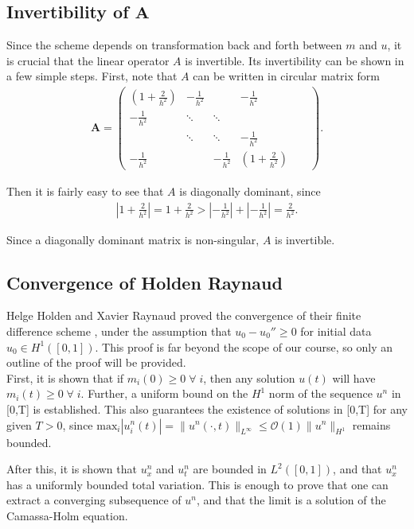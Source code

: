 \subsection*{Invertibility of $\bm{A}$}
Since the scheme depends on transformation back and forth between $m$ and $u$, it is crucial that the linear operator $A$ is invertible. Its invertibility can be shown in a few simple steps. First, note that $A$ can be written in circular matrix form
\begin{align*}
\bm{A} = 
\begin{pmatrix}
  (1 + \frac{2}{h^2}) & -\frac{1}{h^2} &  & -\frac{1}{h^2} \\
  -\frac{1}{h^2} & \ddots & \ddots  &  & &   \\
  & \ddots & \ddots & -\frac{1}{h^2}\\
  -\frac{1}{h^2} & & -\frac{1}{h^2} & (1 + \frac{2}{h^2})
 \end{pmatrix}.
\end{align*}

Then it is fairly easy to see that $A$ is diagonally dominant, since
\begin{align*}
|1 + \frac{2}{h^2}| = 1 + \frac{2}{h^2}> |-\frac{1}{h^2}| + |-\frac{1}{h^2}| = \frac{2}{h^2}.
\end{align*}

Since a diagonally dominant matrix is non-singular, $A$ is invertible.

\subsection*{Convergence of Holden Raynaud}
Helge Holden and Xavier Raynaud proved the convergence of their finite difference scheme \cite{holden2006convergence}, under the assumption that $u_{0} - u_{0}'' \geq 0$ for initial data $u_{0} \in H^{1}([0,1])$. This proof is far beyond the scope of our course, so only an outline of the proof will be provided. \\

First, it is shown that if $m_{i}(0) \geq 0 \; \forall \;i$, then any solution $u(t)$ will have $m_{i}(t) \geq 0 \; \forall \;i $. Further, a uniform bound on the $H^{1}$ norm of the sequence $u^{n}$ in [0,T] is established. This also guarantees the existence of solutions in [0,T] for any given $T > 0$, since $\text{max}_{i}|u_{i}^{n}(t)| = \|u^{n}(\cdot,t)\|_{L^{\infty}} \leq \mathcal{O}(1) \|u^{n}\|_{H^{1}}$ remains bounded.

After this, it is shown that $u_{x}^{n}$ and $u_{t}^{n}$ are bounded in $L^{2}([0,1])$, and that $u_{x}^{n}$ has a uniformly bounded total variation. This is enough to prove that one can extract a converging subsequence of $u^{n}$, and that the limit is a solution of the Camassa-Holm equation. 

